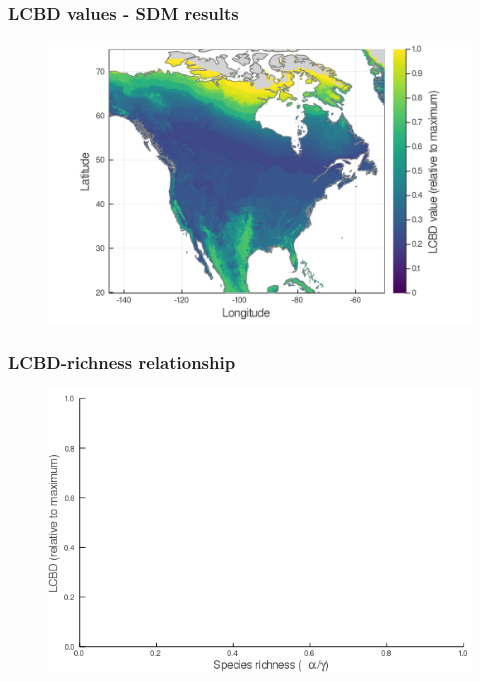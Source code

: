 \documentclass[10pt, aspectratio=1610]{beamer}
\begin{document}
\begin{frame}
  \frametitle{LCBD values - SDM results}
  \begin{figure}
    \centering
    \hspace*{-0cm}\includegraphics[scale=0.20]{fig/05_sdm_lcbd.png}
  \end{figure}
\end{frame}

\begin{frame}
  \frametitle{LCBD-richness relationship}
  \begin{figure}
    \centering
    \includegraphics[scale=0.5]{fig/06_cmb_relation-oneplot-empty.png}
  \end{figure}
\end{frame}
\end{document}
